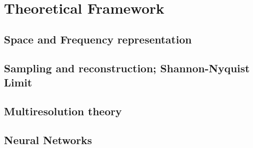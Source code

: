 \section{Theoretical Framework}

\subsection{Space and Frequency representation}


\subsection{Sampling and reconstruction; Shannon-Nyquist Limit} 

\subsection{Multiresolution theory}

\subsection{Neural Networks}



